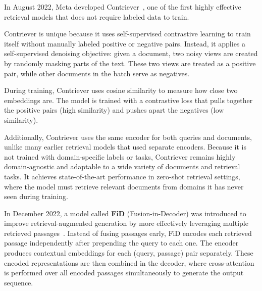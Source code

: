 \documentclass[twocolumn, 10pt]{article}
\begin{document}
In August 2022, Meta developed Contriever~\cite{izacard2022unsupervised}, one of the first highly effective retrieval models that does not require labeled data to train.

Contriever is unique because it uses self-supervised contrastive learning to train itself without manually labeled positive or negative pairs. Instead, it applies a self-supervised denoising objective: given a document, two noisy views are created by randomly masking parts of the text. These two views are treated as a positive pair, while other documents in the batch serve as negatives.

During training, Contriever uses cosine similarity to measure how close two embeddings are. The model is trained with a contrastive loss that pulls together the positive pairs (high similarity) and pushes apart the negatives (low similarity).

Additionally, Contriever uses the same encoder for both queries and documents, unlike many earlier retrieval models that used separate encoders. Because it is not trained with domain-specific labels or tasks, Contriever remains highly domain-agnostic and adaptable to a wide variety of documents and retrieval tasks. It achieves state-of-the-art performance in zero-shot retrieval settings, where the model must retrieve relevant documents from domains it has never seen during training.

In December 2022, a model called \textbf{FiD} (Fusion-in-Decoder) was introduced to improve retrieval-augmented generation by more effectively leveraging multiple retrieved passages~\cite{deJong2022FiDO}.  
Instead of fusing passages early, FiD encodes each retrieved passage independently after prepending the query to each one.  
The encoder produces contextual embeddings for each (query, passage) pair separately.  
These encoded representations are then combined in the decoder, where cross-attention is performed over all encoded passages simultaneously to generate the output sequence.
\end{document}
